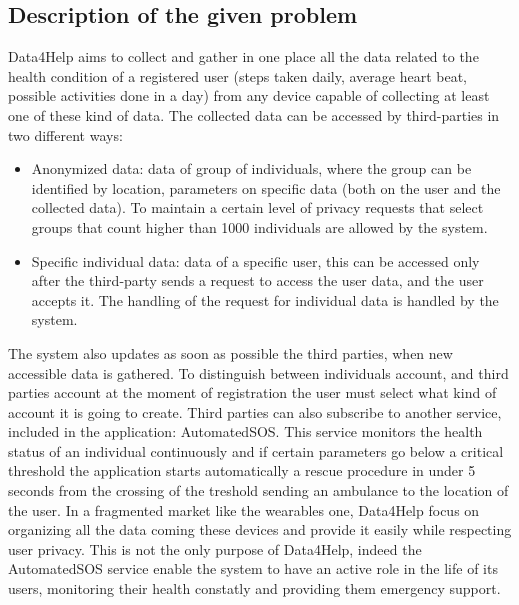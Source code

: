 \subsection{Description of the given problem}
Data4Help aims to collect and gather in one place all the data related to the health condition of a registered user (steps taken daily, average heart beat, possible activities done in a day) from any device capable of collecting at least one of these kind of data.
The collected data can be accessed by third-parties in two different ways:
\begin{itemize}
\item Anonymized data: data of group of individuals, where the group can be identified by location, parameters on specific data (both on the user and the collected data). To maintain a certain level of privacy requests that select groups that count higher than 1000 individuals are allowed by the system.
\item Specific individual data: data of a specific user, this can be accessed only after the third-party sends a request to access the user data, and the user accepts it. The handling of the request for individual data is handled by the system.
\end{itemize}
The system also updates as soon as possible the third parties, when new accessible data is gathered.
To distinguish between individuals account, and third parties account at the moment of registration the user must select what kind of account it is going to create.
Third parties can also subscribe to another service, included in the application: AutomatedSOS. This service monitors the health status of an individual continuously and if certain parameters go below a critical threshold the application starts automatically a rescue procedure in under 5 seconds from the crossing of the treshold sending an ambulance to the location of the user.
\newline
In a fragmented market like the wearables one, Data4Help focus on organizing all the data coming these devices and provide it easily while respecting user privacy.
 \newline
This is not the only purpose of Data4Help, indeed the AutomatedSOS service enable the system to have an active role in the life of its users, monitoring their health constatly and providing them emergency support.
